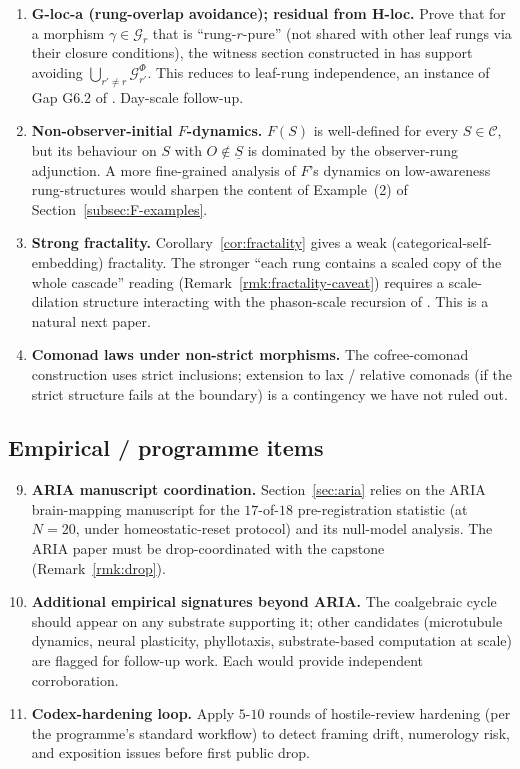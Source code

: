 \documentclass[11pt, a4paper]{amsart}
\theoremstyle{definition}
\newcommand{\catC}{\mathcal{C}}
\newcommand{\Gcal}{\mathcal{G}}
\newcommand{\Qalg}{\mathsf{Q}}
\begin{document}
\begin{enumerate}
  bare-rung $\Qalg_S$ of \cite{CascadeAccessPrinciple}. No
  new analytic content is required.
\item \textbf{G-loc-a (rung-overlap avoidance); residual from
  H-loc.} Prove that for a morphism $\gamma \in \Gcal_r$ that
  is ``rung-$r$-pure'' (not shared with other leaf rungs via
  their closure conditions), the witness section constructed
  in \cite{CascadeHlocClosure} has support avoiding
  $\bigcup_{r' \ne r} \Gcal_{r'}^\Phi$. This reduces to
  leaf-rung independence, an instance of Gap G6.2 of
  \cite{CascadeObserverQueryAlgebra}. Day-scale follow-up.
\item \textbf{Non-observer-initial $F$-dynamics.} $F(S)$ is
  well-defined for every $S \in \catC$, but its behaviour on
  $S$ with $O \notin \underline{S}$ is dominated by the
  observer-rung adjunction. A more fine-grained analysis of
  $F$'s dynamics on low-awareness rung-structures would sharpen
  the content of Example~(2) of Section~\ref{subsec:F-examples}.
\item \textbf{Strong fractality.} Corollary~\ref{cor:fractality}
  gives a weak (categorical-self-embedding) fractality. The
  stronger ``each rung contains a scaled copy of the whole
  cascade'' reading (Remark~\ref{rmk:fractality-caveat})
  requires a scale-dilation structure interacting with the
  phason-scale recursion of \cite{Cascade12D}. This is a
  natural next paper.
\item \textbf{Comonad laws under non-strict morphisms.} The
  cofree-comonad construction uses strict inclusions; extension
  to lax / relative comonads (if the strict structure fails at
  the boundary) is a contingency we have not ruled out.
\end{enumerate}

\subsection{Empirical / programme items}

\begin{enumerate}\setcounter{enumi}{8}
\item \textbf{ARIA manuscript coordination.}
  Section~\ref{sec:aria} relies on the ARIA brain-mapping
  manuscript for the $17$-of-$18$ pre-registration statistic
  (at $N{=}20$, under homeostatic-reset protocol) and its
  null-model analysis. The ARIA paper must be drop-coordinated
  with the capstone (Remark~\ref{rmk:drop}).
\item \textbf{Additional empirical signatures beyond ARIA.}
  The coalgebraic cycle should appear on any substrate
  supporting it; other candidates (microtubule dynamics, neural
  plasticity, phyllotaxis, substrate-based computation at scale)
  are flagged for follow-up work. Each would provide
  independent corroboration.
\item \textbf{Codex-hardening loop.} Apply $5$-$10$ rounds of
  hostile-review hardening (per the programme's standard
  workflow) to detect framing drift, numerology risk, and
  exposition issues before first public drop.
\end{enumerate}
\end{document}
